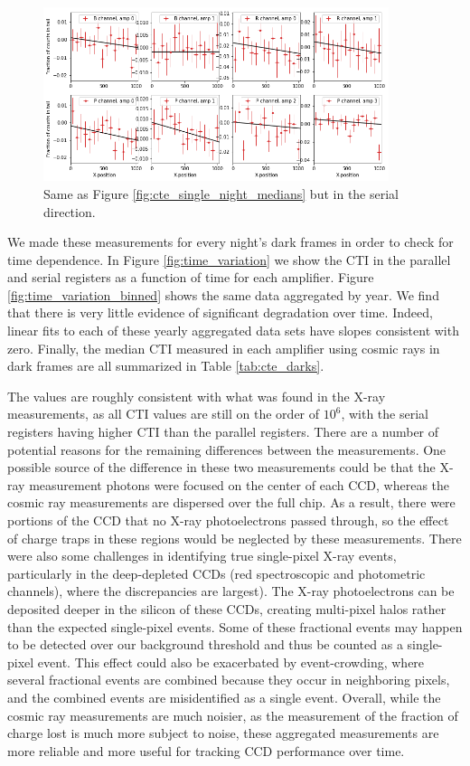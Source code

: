 \begin{figure}
    \centering
    \includegraphics[width=0.9\textwidth]{figures/cte/single_night_example_serial_medians.png}
    \caption{Same as Figure \ref{fig:cte_single_night_medians} but in the serial direction.}
    \label{fig:cte_single_night_serial_medians}
\end{figure}

We made these measurements for every night's dark frames in order to check for time dependence. In Figure \ref{fig:time_variation} we show the CTI in the parallel and serial registers as a function of time for each amplifier. Figure \ref{fig:time_variation_binned} shows the same data aggregated by year. We find that there is very little evidence of significant degradation over time. Indeed, linear fits to each of these yearly aggregated data sets have slopes consistent with zero. Finally, the median CTI measured in each amplifier using cosmic rays in dark frames are all summarized in Table \ref{tab:cte_darks}.

The values are roughly consistent with what was found in the X-ray measurements, as all CTI values are still on the order of $10^6$, with the serial registers having higher CTI than the parallel registers. There are a number of potential reasons for the remaining differences between the measurements. One possible source of the difference in these two measurements could be that the X-ray measurement photons were focused on the center of each CCD, whereas the cosmic ray measurements are dispersed over the full chip. As a result, there were portions of the CCD that no X-ray photoelectrons passed through, so the effect of charge traps in these regions would be neglected by these measurements. There were also some challenges in identifying true single-pixel X-ray events, particularly in the deep-depleted CCDs (red spectroscopic and photometric channels), where the discrepancies are largest). The X-ray photoelectrons can be deposited deeper in the silicon of these CCDs, creating multi-pixel halos rather than the expected single-pixel events. Some of these fractional events may happen to be detected over our background threshold and thus be counted as a single-pixel event. This effect could also be exacerbated by event-crowding, where several fractional events are combined because they occur in neighboring pixels, and the combined events are misidentified as a single event. Overall, while the cosmic ray measurements are much noisier, as the measurement of the fraction of charge lost is much more subject to noise, these aggregated measurements are more reliable and more useful for tracking CCD performance over time. 

